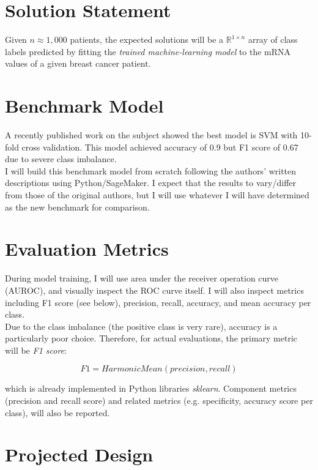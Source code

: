 \documentclass[11pt]{diazessay}
\begin{document}
\section{Solution Statement}

Given $n \approx 1,000$ patients, the expected solutions will be a $\mathbb{R}^{1 \times n}$ array of class labels predicted by fitting the \textit{trained machine-learning model} to the mRNA values of a given breast cancer patient.

\section{Benchmark Model}

A recently published work on the subject \cite{wu2021} showed the best model is SVM with 10-fold cross validation. This model achieved accuracy of 0.9 but F1 score of 0.67 due to severe class imbalance. \\

I will build this benchmark model from scratch following the authors' written descriptions using Python/SageMaker. I expect that the results to vary/differ from those of the original authors, but I will use whatever I will have determined as the new benchmark for comparison.

\section{Evaluation Metrics}

During model training, I will use area under the receiver operation curve (AUROC), and visually inspect the ROC curve itself. I will also inspect metrics including F1 score (see below), precision, recall, accuracy, and mean accuracy per class. \\

Due to the class imbalance (the positive class is very rare), accuracy is a particularly poor choice. Therefore, for actual evaluations, the primary metric will be \textit{F1 score}:

$$F1 = HarmonicMean(precision, recall)$$

which is already implemented in Python libraries \textit{sklearn}. Component metrics (precision and recall score) and related metrics (e.g. specificity, accuracy score per class), will also be reported.


\section{Projected Design}
\end{document}

